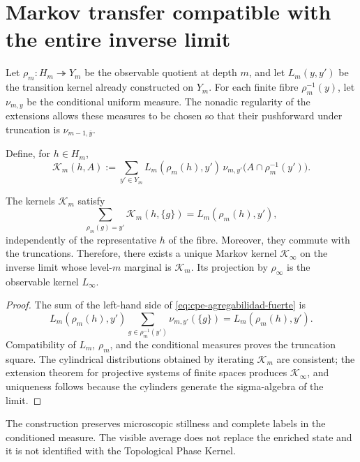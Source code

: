 \section{Markov transfer compatible with the entire inverse limit}
\label{sec:cpe-transferencia-limite-inverso}

Let \(\rho_m:H_m\twoheadrightarrow Y_m\) be the observable quotient at depth
\(m\), and let \(L_m(y,y')\) be the transition kernel already constructed on
\(Y_m\). For each finite fibre \(\rho_m^{-1}(y)\), let
\(\nu_{m,y}\) be the conditional uniform measure. The nonadic regularity of
the extensions allows these measures to be chosen so that their pushforward under
truncation is \(\nu_{m-1,\bar y}\).

Define, for \(h\in H_m\),
\begin{equation}
 \mathcal K_m(h,A)
 :=\sum_{y'\in Y_m}
 L_m(\rho_m(h),y')\,
 \nu_{m,y'}\bigl(A\cap\rho_m^{-1}(y')\bigr).
 \label{eq:cpe-kernel-lift-uniforme}
\end{equation}

\begin{theorem}
\label{thm:cpe-kernel-proyectivo}
The kernels \(\mathcal K_m\) satisfy
\begin{equation}
 \sum_{\rho_m(g)=y'}\mathcal K_m(h,\{g\})
 =L_m(\rho_m(h),y'),
 \label{eq:cpe-agregabilidad-fuerte}
\end{equation}
independently of the representative \(h\) of the fibre. Moreover, they commute with
the truncations. Therefore, there exists a unique Markov kernel
\(\mathcal K_\infty\) on the inverse limit whose level-\(m\) marginal
is \(\mathcal K_m\). Its projection by \(\rho_\infty\) is the observable
kernel \(L_\infty\).
\end{theorem}

\begin{proof}
The sum of the left-hand side of
\eqref{eq:cpe-agregabilidad-fuerte} is
\[
 L_m(\rho_m(h),y')
 \sum_{g\in\rho_m^{-1}(y')}\nu_{m,y'}(\{g\})
 =L_m(\rho_m(h),y').
\]
Compatibility of \(L_m\), \(\rho_m\), and the conditional measures proves the truncation square. The cylindrical distributions obtained by iterating \(\mathcal K_m\) are consistent; the extension theorem for projective systems of finite spaces produces \(\mathcal K_\infty\), and uniqueness follows because the cylinders generate the sigma-algebra of the limit.
\end{proof}

The construction preserves microscopic stillness and complete labels
in the conditioned measure. The visible average does not replace the
enriched state and it is not identified with the Topological Phase Kernel.

